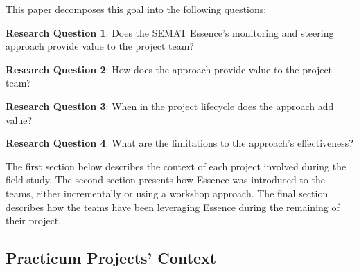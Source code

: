 This paper decomposes this goal into the following questions:

\textbf{Research Question 1}: Does the SEMAT Essence's monitoring and steering approach provide value to the project team?

\textbf{Research Question 2}: How does the approach provide value to the project team?

\textbf{Research Question 3}: When in the project lifecycle does the approach add value?

\textbf{Research Question 4}: What are the limitations to the approach's effectiveness?

The first section below describes the context of each project involved during the field study. The second section presents how Essence was introduced to the teams, either incrementally or using a workshop approach. The final section describes how the teams have been leveraging Essence during the remaining of their project.

\subsection{Practicum Projects' Context}


